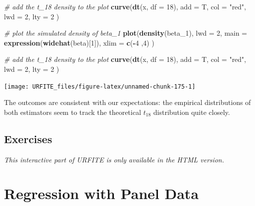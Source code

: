 \documentclass[]{book}
\newenvironment{Shaded}{\begin{snugshade}}{\end{snugshade}}
\newcommand{\KeywordTok}[1]{\textcolor[rgb]{0.13,0.29,0.53}{\textbf{#1}}}
\newcommand{\DataTypeTok}[1]{\textcolor[rgb]{0.13,0.29,0.53}{#1}}
\newcommand{\DecValTok}[1]{\textcolor[rgb]{0.00,0.00,0.81}{#1}}
\newcommand{\StringTok}[1]{\textcolor[rgb]{0.31,0.60,0.02}{#1}}
\newcommand{\CommentTok}[1]{\textcolor[rgb]{0.56,0.35,0.01}{\textit{#1}}}
\newcommand{\OperatorTok}[1]{\textcolor[rgb]{0.81,0.36,0.00}{\textbf{#1}}}
\newcommand{\NormalTok}[1]{#1}
\theoremstyle{definition}
\theoremstyle{definition}
\theoremstyle{definition}
\theoremstyle{remark}
\begin{document}
\begin{Shaded}
\begin{Highlighting}[]
\CommentTok{# add the t_18 density to the plot}
\KeywordTok{curve}\NormalTok{(}\KeywordTok{dt}\NormalTok{(x, }\DataTypeTok{df =} \DecValTok{18}\NormalTok{), }
      \DataTypeTok{add =}\NormalTok{ T, }
      \DataTypeTok{col =} \StringTok{"red"}\NormalTok{, }
      \DataTypeTok{lwd =} \DecValTok{2}\NormalTok{, }
      \DataTypeTok{lty =} \DecValTok{2}
\NormalTok{      )}

\CommentTok{# plot the simulated density of beta_1}
\KeywordTok{plot}\NormalTok{(}\KeywordTok{density}\NormalTok{(beta_}\DecValTok{1}\NormalTok{), }
     \DataTypeTok{lwd =} \DecValTok{2}\NormalTok{, }
     \DataTypeTok{main =} \KeywordTok{expression}\NormalTok{(}\KeywordTok{widehat}\NormalTok{(beta)[}\DecValTok{1}\NormalTok{]), }\DataTypeTok{xlim =} \KeywordTok{c}\NormalTok{(}\OperatorTok{-}\DecValTok{4}\NormalTok{ ,}\DecValTok{4}\NormalTok{)}
\NormalTok{     )}

\CommentTok{# add the t_18 density to the plot}
\KeywordTok{curve}\NormalTok{(}\KeywordTok{dt}\NormalTok{(x, }\DataTypeTok{df =} \DecValTok{18}\NormalTok{), }
      \DataTypeTok{add =}\NormalTok{ T, }
      \DataTypeTok{col =} \StringTok{"red"}\NormalTok{, }
      \DataTypeTok{lwd =} \DecValTok{2}\NormalTok{, }
      \DataTypeTok{lty =} \DecValTok{2}
\NormalTok{      ) }
\end{Highlighting}
\end{Shaded}

\begin{center}\texttt{[image: URFITE\_files/figure-latex/unnamed-chunk-175-1]} \end{center}

The outcomes are consistent with our expectations: the empirical
distributions of both estimators seem to track the theoretical
\(t_{18}\) distribution quite closely.

\section{Exercises}\label{exercises-3}

\begin{center}\textit{This interactive part of URFITE is only available in the HTML version.}\end{center}

\chapter{Regression with Panel Data}\label{regression-with-panel-data}
\end{document}

